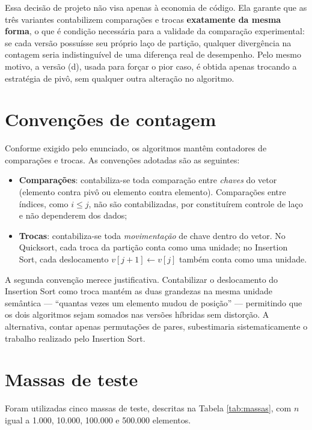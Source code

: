 Essa decisão de projeto não visa apenas à economia de código. Ela garante que as três
variantes contabilizem comparações e trocas \textbf{exatamente da mesma forma}, o que
é condição necessária para a validade da comparação experimental: se cada versão
possuísse seu próprio laço de partição, qualquer divergência na contagem seria
indistinguível de uma diferença real de desempenho. Pelo mesmo motivo, a versão (d),
usada para forçar o pior caso, é obtida apenas trocando a estratégia de pivô, sem
qualquer outra alteração no algoritmo.

\section{Convenções de contagem}

Conforme exigido pelo enunciado, os algoritmos mantêm contadores de comparações e
trocas. As convenções adotadas são as seguintes:

\begin{itemize}
  \item \textbf{Comparações}: contabiliza-se toda comparação entre \textit{chaves} do
        vetor (elemento contra pivô ou elemento contra elemento). Comparações entre
        índices, como $i \leq j$, não são contabilizadas, por constituírem controle de
        laço e não dependerem dos dados;
  \item \textbf{Trocas}: contabiliza-se toda \textit{movimentação} de chave dentro do
        vetor. No Quicksort, cada troca da partição conta como uma unidade; no
        Insertion Sort, cada deslocamento $v[j+1] \leftarrow v[j]$ também conta como
        uma unidade.
\end{itemize}

A segunda convenção merece justificativa. Contabilizar o deslocamento do Insertion
Sort como troca mantém as duas grandezas na mesma unidade semântica --- ``quantas
vezes um elemento mudou de posição'' --- permitindo que os dois algoritmos sejam
somados nas versões híbridas sem distorção. A alternativa, contar apenas permutações
de pares, subestimaria sistematicamente o trabalho realizado pelo Insertion Sort.

\section{Massas de teste}
\label{sec:massas}

Foram utilizadas cinco massas de teste, descritas na Tabela \ref{tab:massas}, com
$n$ igual a 1.000, 10.000, 100.000 e 500.000 elementos.


